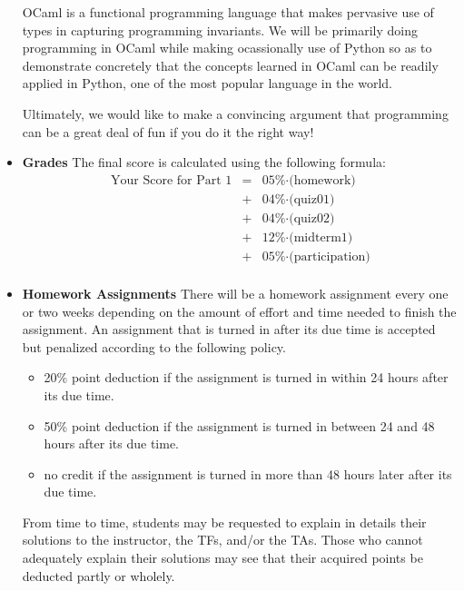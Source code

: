 \documentclass[11pt]{article}
\begin{document}
\begin{itemize}
OCaml is a functional programming language that makes pervasive use of
types in capturing programming invariants. We will be primarily doing
programming in OCaml while making ocassionally use of Python so as to
demonstrate concretely that the concepts learned in OCaml can be
readily applied in Python, one of the most popular language in the
world.

Ultimately, we would like to make a convincing argument that programming
can be a great deal of fun if you do it the right way!

\item {\bf Grades}
The final score is calculated using the following formula:
\[\begin{array}{rcl}
\mbox{Your Score for Part~1} & = & \mbox{05\%$\cdot$(homework)} \\
                   & + & \mbox{04\%$\cdot$(quiz01)} \\
                   & + & \mbox{04\%$\cdot$(quiz02)} \\
                   & + & \mbox{12\%$\cdot$(midterm1)} \\
                   & + & \mbox{05\%$\cdot$(participation)} \\
\end{array}\]

\item{\bf Homework Assignments}
There will be a homework assignment every one or two weeks depending on the
amount of effort and time needed to finish the assignment. An assignment that
is turned in after its due time is accepted but penalized according to the
following policy.
\begin{itemize}
\item 20\% point deduction if the assignment is turned in within 24 hours
after its due time.
\item 50\% point deduction if the assignment is turned in between 24 and 48 hours
after its due time.
\item no credit if the assignment is turned in more than 48 hours later after its due time.
\end{itemize}
From time to time, students may be requested to explain in details
their solutions to the instructor, the TFs, and/or the TAs. Those who
cannot adequately explain their solutions may see that their acquired
points be deducted partly or wholely.


\end{itemize}
\end{document}
